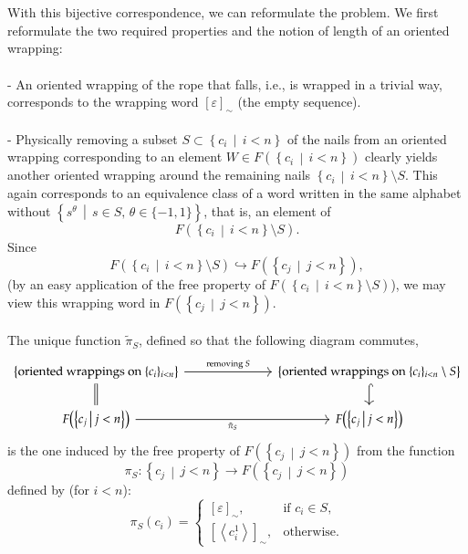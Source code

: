 \documentclass[11pt, a4paper, oneside]{article}
\theoremstyle{remark}
\theoremstyle{lemma}
\begin{document}
\\\\
With this bijective correspondence, we can reformulate the problem. We first reformulate the two required properties and the notion of length of an oriented wrapping:
\\\\
- An oriented wrapping of the rope that falls, i.e., is wrapped in a trivial way, corresponds to the wrapping word \( [\varepsilon]_{\sim} \) (the empty sequence).
\\\\
- Physically removing a subset \(S \subset \left\{c_i \,\middle|\, i<n\right\}\) of the nails from an oriented wrapping corresponding to an element 
\(W \in F\!\left(\left\{ c_i \,\middle|\, i<n \right\}\right)\) clearly yields another oriented wrapping around the remaining nails 
\(\left\{ c_i \,\middle|\, i<n \right\}\setminus S\). This again corresponds to an equivalence class of a word written in the same alphabet without 
\(\left\{ s^{\theta} \,\middle|\, s \in S,\, \theta \in \{-1,1\} \right\}\), that is, an element of 
\[
F\!\left(\left\{ c_i \,\middle|\, i<n \right\}\setminus S\right).
\]
Since 
\[
F\!\left(\left\{ c_i \,\middle|\, i<n \right\}\setminus S\right) \hookrightarrow F\!\left(\left\{ c_j \,\middle|\, j<n \right\}\right),
\]
(by an easy application of the free property of \(F\!\left(\left\{ c_i \,\middle|\, i<n \right\}\setminus S\right) \)),
we may view this wrapping word in \(F\!\left(\left\{ c_j \,\middle|\, j<n \right\}\right)\).
\\\\
The unique function \(\tilde{\pi}_S\), defined so that the following diagram commutes,
\[
\begin{tikzcd}
    {\left\{\text{oriented wrappings on }\{c_i\}_{i<n}\right\}} &&& {\left\{\text{oriented wrappings on }\{c_i\}_{i<n}\setminus S\right\}} \\
    {F\!\left(\left\{c_j \,\middle|\, j<n\right\}\right)} &&& {F\!\left(\left\{c_j \,\middle|\, j<n\right\}\right)}
    \arrow["{\text{removing } S}", from=1-1, to=1-4]
    \arrow[equals, from=1-1, to=2-1]
    \arrow[hookrightarrow, from=1-4, to=2-4]
    \arrow["{\tilde{\pi}_S}"', from=2-1, to=2-4]
\end{tikzcd}
\]
is the one induced by the free property of 
\(F\!\left(\left\{c_j \,\middle|\, j<n\right\}\right)\) 
from the function 
\[
\pi_S:\left\{c_j \,\middle|\, j<n\right\} \longrightarrow F\!\left(\left\{c_j \,\middle|\, j<n\right\}\right)
\] 
defined by (for $i<n$):
\[
\pi_S(c_i) =
\begin{cases}
[\varepsilon]_{\sim}, & \text{if } c_i \in S,\\[2mm]
\left[\left\langle c_i^1\right\rangle\right]_{\sim}, & \text{otherwise.}
\end{cases}
\]
\end{document}
